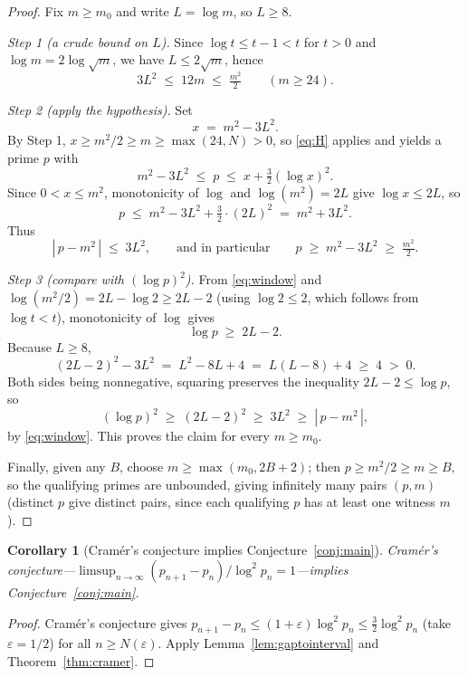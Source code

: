 \documentclass[11pt]{article}
\newtheorem{corollary}[theorem]{Corollary}
\theoremstyle{definition}
\theoremstyle{remark}
\begin{document}
\begin{proof}
Fix $m \ge m_0$ and write $L = \log m$, so $L \ge 8$.

\emph{Step 1 (a crude bound on $L$).} Since $\log t \le t - 1 < t$ for $t > 0$ and $\log m = 2\log\sqrt{m}$, we have $L \le 2\sqrt{m}$, hence
\[
3L^2 \;\le\; 12 m \;\le\; \tfrac{m^2}{2}
\qquad (m \ge 24).
\]

\emph{Step 2 (apply the hypothesis).} Set
\[
x \;=\; m^2 - 3L^2 .
\]
By Step 1, $x \ge m^2/2 \ge m \ge \max(24, N) > 0$, so \eqref{eq:H} applies and yields a prime $p$ with
\[
m^2 - 3L^2 \;\le\; p \;\le\; x + \tfrac32(\log x)^2 .
\]
Since $0 < x \le m^2$, monotonicity of $\log$ and $\log(m^2) = 2L$ give $\log x \le 2L$, so
\[
p \;\le\; m^2 - 3L^2 + \tfrac32\cdot (2L)^2 \;=\; m^2 + 3L^2 .
\]
Thus
\begin{equation}\label{eq:window}
|\,p - m^2\,| \;\le\; 3L^2, \qquad\text{and in particular}\qquad p \;\ge\; m^2 - 3L^2 \;\ge\; \tfrac{m^2}{2}.
\end{equation}

\emph{Step 3 (compare with $(\log p)^2$).} From \eqref{eq:window} and $\log(m^2/2) = 2L - \log 2 \ge 2L - 2$ (using $\log 2 \le 2$, which follows from $\log t < t$), monotonicity of $\log$ gives
\[
\log p \;\ge\; 2L - 2 .
\]
Because $L \ge 8$,
\[
(2L-2)^2 - 3L^2 \;=\; L^2 - 8L + 4 \;=\; L(L-8) + 4 \;\ge\; 4 \;>\; 0 .
\]
Both sides being nonnegative, squaring preserves the inequality $2L - 2 \le \log p$, so
\[
(\log p)^2 \;\ge\; (2L-2)^2 \;\ge\; 3L^2 \;\ge\; |\,p - m^2\,| ,
\]
by \eqref{eq:window}. This proves the claim for every $m \ge m_0$.

Finally, given any $B$, choose $m \ge \max(m_0, 2B+2)$; then $p \ge m^2/2 \ge m \ge B$, so the qualifying primes are unbounded, giving infinitely many pairs $(p, m)$ (distinct $p$ give distinct pairs, since each qualifying $p$ has at least one witness $m$).
\end{proof}

\begin{corollary}[Cramér's conjecture implies Conjecture~\ref{conj:main}]\label{cor:cramer}
Cramér's conjecture---$\limsup_{n\to\infty} (p_{n+1}-p_n)/\log^2 p_n = 1$---implies Conjecture~\ref{conj:main}.
\end{corollary}

\begin{proof}
Cramér's conjecture gives $p_{n+1} - p_n \le (1+\varepsilon)\log^2 p_n \le \tfrac32 \log^2 p_n$ (take $\varepsilon = 1/2$) for all $n \ge N(\varepsilon)$. Apply Lemma~\ref{lem:gaptointerval} and Theorem~\ref{thm:cramer}.
\end{proof}
\end{document}
